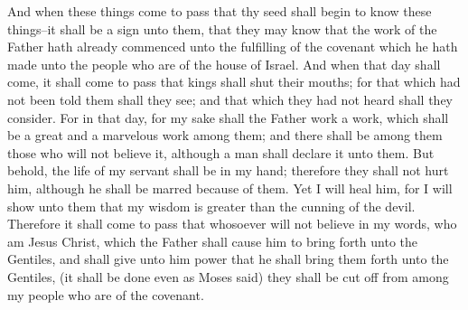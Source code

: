 \bverse \iffalse And when these things come to pass that thy seed shall begin to know these things--it shall be a sign unto them, that they may know that the work of the Father hath already commenced unto the fulfilling of the covenant which he hath made unto the people who are of the house of Israel. \fi
And when these things come to pass that thy seed shall begin to know these things--it shall be a sign unto them, that they may know that the work of the Father hath already commenced unto the fulfilling of the covenant which he hath made unto the people who are of the house of Israel.
\bverse \iffalse And when that day shall come, it shall come to pass that kings shall shut their mouths; for that which had not been told them shall they see; and that which they had not heard shall they consider. \fi
And when that day shall come, it shall come to pass that kings shall shut their mouths; for that which had not been told them shall they see; and that which they had not heard shall they consider.
\bverse \iffalse For in that day, for my sake shall the Father work a work, which shall be a great and a marvelous work among them; and there shall be among them those who will not believe it, although a man shall declare it unto them. \fi
For in that day, for my sake shall the Father work a work, which shall be a great and a marvelous work among them; and there shall be among them those who will not believe it, although a man shall declare it unto them.
\bverse \iffalse But behold, the life of my servant shall be in my hand; therefore they shall not hurt him, although he shall be marred because of them. Yet I will heal him, for I will show unto them that my wisdom is greater than the cunning of the devil. \fi
But behold, the life of my servant shall be in my hand; therefore they shall not hurt him, although he shall be marred because of them. Yet I will heal him, for I will show unto them that my wisdom is greater than the cunning of the devil.
\bverse \iffalse Therefore it shall come to pass that whosoever will not believe in my words, who am Jesus Christ, which the Father shall cause him to bring forth unto the Gentiles, and shall give unto him power that he shall bring them forth unto the Gentiles, (it shall be done even as Moses said) they shall be cut off from among my people who are of the covenant. \fi
Therefore it shall come to pass that whosoever will not believe in my words, who am Jesus Christ, which the Father shall cause him to bring forth unto the Gentiles, and shall give unto him power that he shall bring them forth unto the Gentiles, (it shall be done even as Moses said) they shall be cut off from among my people who are of the covenant.
